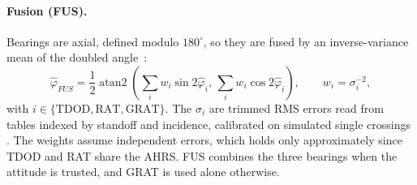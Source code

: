 \paragraph{Fusion (FUS).}
Bearings are axial, defined modulo $180^\circ$, so they are fused by an inverse-variance mean of the doubled angle~\cite{mardia2000directional}:
\begin{equation}
\hat{\varphi}_{FUS} = \frac{1}{2} \operatorname{atan2}\left(\sum_i w_i \sin 2\hat{\varphi}_i,\, \sum_i w_i \cos 2\hat{\varphi}_i\right), \qquad w_i = \sigma_i^{-2},
\label{eq:fus}
\end{equation}
with $i \in \{\mathrm{TDOD}, \mathrm{RAT}, \mathrm{GRAT}\}$. The $\sigma_i$ are trimmed RMS errors read from tables indexed by standoff and incidence, calibrated on simulated single crossings . The weights assume independent errors, which holds only approximately since TDOD and RAT share the AHRS. FUS combines the three bearings when the attitude is trusted, and GRAT is used alone otherwise.
